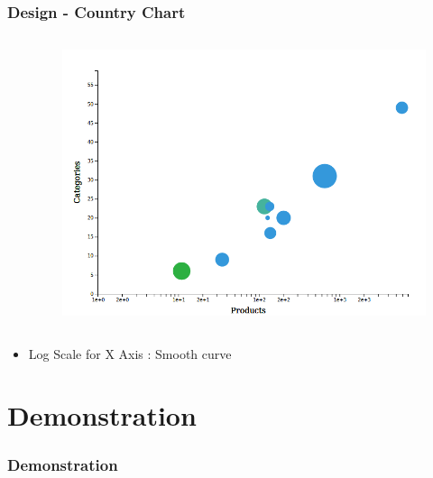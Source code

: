 \documentclass{beamer}
\begin{document}
\begin{frame}
\frametitle{Design - Country Chart}

\begin{columns}[T]
  \begin{column}{.7\textwidth}
    \begin{table}
    \end{table}
  \end{column}
  \begin{column}{.25\textwidth}
    \begin{figure}
      \centering
      \includegraphics[scale=0.1]{img/country.png}
    \end{figure}
  \end{column}
\end{columns}
\begin{itemize}
\item Log Scale for X Axis : Smooth curve 
\end{itemize}
\end{frame}

\section{Demonstration}
\begin{frame}
  \frametitle{Demonstration}
\end{frame}
\end{document}
